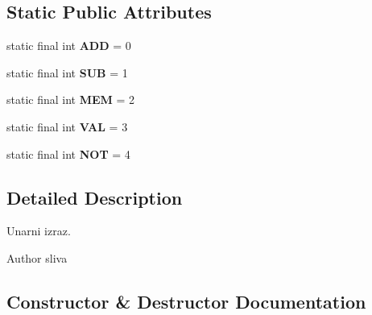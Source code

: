 \subsection*{Static Public Attributes}
\begin{DoxyCompactItemize}
\item 
\mbox{\label{classcompiler_1_1abstr_1_1tree_1_1expr_1_1_abs_un_expr_a2ce4c505d94eb62c138c3bcb68460815}} 
static final int {\bfseries A\+DD} = 0
\item 
\mbox{\label{classcompiler_1_1abstr_1_1tree_1_1expr_1_1_abs_un_expr_a0f4cbf7825c37f7e05a746ec33736af2}} 
static final int {\bfseries S\+UB} = 1
\item 
\mbox{\label{classcompiler_1_1abstr_1_1tree_1_1expr_1_1_abs_un_expr_a6dd57845f2ab275651675c9d53024047}} 
static final int {\bfseries M\+EM} = 2
\item 
\mbox{\label{classcompiler_1_1abstr_1_1tree_1_1expr_1_1_abs_un_expr_aaab962e3d8978639d4b9d09fb0a65191}} 
static final int {\bfseries V\+AL} = 3
\item 
\mbox{\label{classcompiler_1_1abstr_1_1tree_1_1expr_1_1_abs_un_expr_a9d6703378e752668aff0270698659d39}} 
static final int {\bfseries N\+OT} = 4
\end{DoxyCompactItemize}


\subsection{Detailed Description}
Unarni izraz.

\begin{DoxyAuthor}{Author}
sliva 
\end{DoxyAuthor}


\subsection{Constructor \& Destructor Documentation}
\mbox{\label{classcompiler_1_1abstr_1_1tree_1_1expr_1_1_abs_un_expr_a017c608a0adebb41949d8ca472d8bd10}} 
